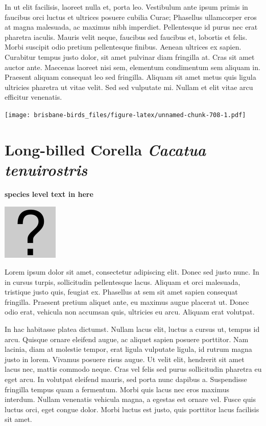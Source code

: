 \documentclass[]{book}
\let\origfigure\figure
\let\endorigfigure\endfigure
\renewenvironment{figure}[1][2] {
  \expandafter\origfigure\expandafter[H]
} {
  \endorigfigure
}
\begin{document}
In ut elit facilisis, laoreet nulla et, porta leo. Vestibulum ante ipsum
primis in faucibus orci luctus et ultrices posuere cubilia Curae;
Phasellus ullamcorper eros at magna malesuada, ac maximus nibh
imperdiet. Pellentesque id purus nec erat pharetra iaculis. Mauris velit
neque, faucibus sed faucibus et, lobortis et felis. Morbi suscipit odio
pretium pellentesque finibus. Aenean ultrices ex sapien. Curabitur
tempus justo dolor, sit amet pulvinar diam fringilla at. Cras sit amet
auctor ante. Maecenas laoreet nisi sem, elementum condimentum sem
aliquam in. Praesent aliquam consequat leo sed fringilla. Aliquam sit
amet metus quis ligula ultricies pharetra ut vitae velit. Sed sed
vulputate mi. Nullam et elit vitae arcu efficitur venenatis.

\begin{figure}
\centering
\texttt{[image: brisbane-birds\_files/figure-latex/unnamed-chunk-708-1.pdf]}
\caption{\label{fig:unnamed-chunk-708}insert figure caption}
\end{figure}

\section{\texorpdfstring{Long-billed Corella \emph{Cacatua
tenuirostris}}{Long-billed Corella Cacatua tenuirostris}}\label{long-billed-corella-cacatua-tenuirostris}

\textbf{species level text in here}

\begin{figure}
\centering
\includegraphics{assets/missing.png}
\caption{No image for species}
\end{figure}

Lorem ipsum dolor sit amet, consectetur adipiscing elit. Donec sed justo
nunc. In in cursus turpis, sollicitudin pellentesque lacus. Aliquam et
orci malesuada, tristique justo quis, feugiat ex. Phasellus at sem sit
amet sapien consequat fringilla. Praesent pretium aliquet ante, eu
maximus augue placerat ut. Donec odio erat, vehicula non accumsan quis,
ultricies eu arcu. Aliquam erat volutpat.

In hac habitasse platea dictumst. Nullam lacus elit, luctus a cursus ut,
tempus id arcu. Quisque ornare eleifend augue, ac aliquet sapien posuere
porttitor. Nam lacinia, diam at molestie tempor, erat ligula vulputate
ligula, id rutrum magna justo in lorem. Vivamus posuere risus augue. Ut
velit elit, hendrerit sit amet lacus nec, mattis commodo neque. Cras vel
felis sed purus sollicitudin pharetra eu eget arcu. In volutpat eleifend
mauris, sed porta nunc dapibus a. Suspendisse fringilla tempus quam a
fermentum. Morbi quis lacus nec eros maximus interdum. Nullam venenatis
vehicula magna, a egestas est ornare vel. Fusce quis luctus orci, eget
congue dolor. Morbi luctus est justo, quis porttitor lacus facilisis sit
amet.
\end{document}

